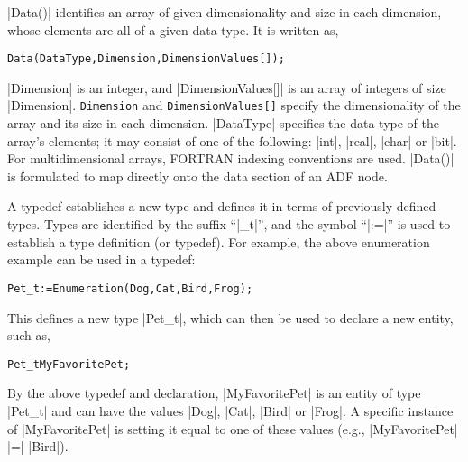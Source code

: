 |Data()| identifies an array of given dimensionality and size in each
dimension, whose elements are all of a given data type.
It is written as,
\begin{alltt}
  Data( DataType, Dimension, DimensionValues[] ) ;
\end{alltt}
|Dimension| is an integer, and |DimensionValues[]| is an array of integers
of size |Dimension|.
\texttt{Dimension} and \texttt{DimensionValues[]} specify the 
dimensionality of the array and its size in each dimension.
|DataType| specifies the data type of the array's elements; it may consist
of one of the following: |int|, |real|, |char| or |bit|.
For multidimensional arrays, FORTRAN indexing conventions are used.  
|Data()| is formulated to map directly onto the data section of an ADF node.

A typedef establishes a new type and defines it in terms of previously
defined types.
Types are identified by the suffix ``|_t|'', and the symbol ``|:=|'' is used
to establish a type definition (or typedef).
For example, the above enumeration example can be used in a typedef:
\begin{alltt}
  Pet\_t := Enumeration( Dog, Cat, Bird, Frog ) ;
\end{alltt}
This defines a new type |Pet_t|, which can then be used to declare a new
entity, such as,
\begin{alltt}
  Pet\_t MyFavoritePet ;
\end{alltt}
By the above typedef and declaration, |MyFavoritePet| is an entity of type
|Pet_t| and can have the values |Dog|, |Cat|, |Bird| or |Frog|.
A specific instance of |MyFavoritePet| is setting it equal to one of these
values (e.g., |MyFavoritePet| |=| |Bird|).

